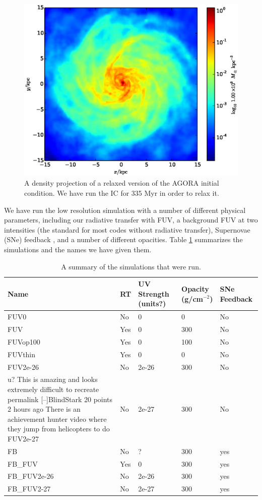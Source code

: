 \begin{figure}
\includegraphics[width=\textwidth]{graphics/AGORAic.eps}
\caption[The AGORA IC]{A density projection of a relaxed version of the AGORA initial condition. We have run the IC for 335 Myr in order to relax it.}
\label{fig:agoraic}
\end{figure}


We have run the low resolution simulation with a number of different physical parameters, including our radiative transfer with FUV, a background FUV at two intensities (the standard for most codes without radiative transfer), Supernovae (SNe) feedback \citep{kellerEt14}, and a number of different opacities. Table \ref{tab:simsummary} summarizes the simulations and the names we have given them.

\begin{table}
\begin{tabular}{lllll}
Name & RT & UV Strength (units?) & Opacity (g/cm$^{-2}$) & SNe Feedback\\ \hline \hline
FUV0 & No & 0 & 0 & No\\
FUV & Yes & 0 & 300 & No\\
FUVop100 & Yes & 0 & 100 & No\\
FUVthin & Yes & 0 & 0 & No\\
FUV2e-26 & No & 2e-26 & 300 & No\\u? This is amazing and looks extremely difficult to recreate
permalink
[–]BlindStark 20 points 2 hours ago 
There is an achievement hunter video where they jump from helicopters to do
FUV2e-27 & No & 2e-27 & 300 & No\\
FB & No & ? & 300 & yes\\
FB\_FUV & Yes & 0 & 300 & yes\\
FB\_FUV2e-26 & No & 2e-26 & 300 & yes\\
FB\_FUV2-27 & No & 2e-27 & 300 & yes\\
\hline
\end{tabular}
\caption[Summary of simulations]{A summary of the simulations that were run.}
\label{tab:simsummary}
\end{table}

